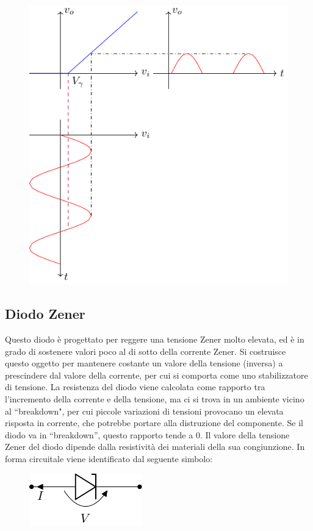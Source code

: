 \documentclass{article}
\numberwithin{equation}{subsection}
\begin{document}
\begin{figure}[H]%
    \centering
    \includegraphics{transcaratteristica-sinusoide.pdf}%
    \label{fig:transcaratteristica-sinusoide}
\end{figure}

\subsection{Diodo Zener}

Questo diodo è progettato per reggere una tensione Zener molto elevata, ed è in grado di sostenere valori poco al di sotto della corrente Zener. 
Si costruisce questo oggetto per mantenere costante un valore della tensione (inversa) a prescindere dal valore della corrente, per cui si comporta come uno stabilizzatore di 
tensione. La resistenza del diodo viene calcolata come rapporto tra l'incremento della corrente e della tensione, ma ci si trova in un ambiente vicino al ``breakdown", 
per cui piccole variazioni di tensioni provocano un elevata risposta in corrente, che potrebbe portare alla distruzione del componente. Se il diodo va in ``breakdown'', 
questo rapporto tende a $0$. Il valore della tensione Zener del diodo dipende dalla resistività dei materiali della sua congiunzione. 
In forma circuitale viene identificato dal seguente simbolo:
\begin{figure}[H]%
    \centering
    \includegraphics{diodo-zener.pdf}%
    \label{fig:diodo-zener}
\end{figure}
\end{document}
